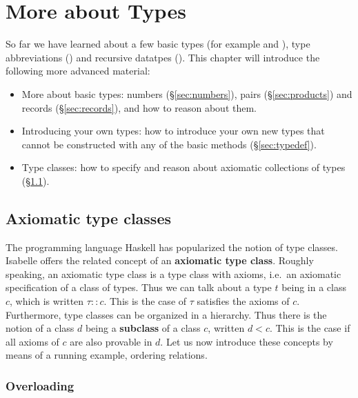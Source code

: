 \chapter{More about Types}

So far we have learned about a few basic types (for example  and
), type abbreviations () and recursive datatpes
(). This chapter will introduce the following more
advanced material:
\begin{itemize}
\item More about basic types: numbers ({\S}\ref{sec:numbers}), pairs
  ({\S}\ref{sec:products}) and records ({\S}\ref{sec:records}), and how to reason
  about them.
\item Introducing your own types: how to introduce your own new types that
  cannot be constructed with any of the basic methods ({\S}\ref{sec:typedef}).
\item Type classes: how to specify and reason about axiomatic collections of
  types ({\S}\ref{sec:axclass}).
\end{itemize}

\section{Axiomatic type classes}
\label{sec:axclass}


The programming language Haskell has popularized the notion of type classes.
Isabelle offers the related concept of an \textbf{axiomatic type class}.
Roughly speaking, an axiomatic type class is a type class with axioms, i.e.\ 
an axiomatic specification of a class of types. Thus we can talk about a type
$t$ being in a class $c$, which is written $\tau :: c$.  This is the case of
$\tau$ satisfies the axioms of $c$. Furthermore, type classes can be
organized in a hierarchy. Thus there is the notion of a class $d$ being a
\textbf{subclass} of a class $c$, written $d < c$. This is the case if all
axioms of $c$ are also provable in $d$. Let us now introduce these concepts
by means of a running example, ordering relations.

\subsection{Overloading}
\label{sec:overloading}









